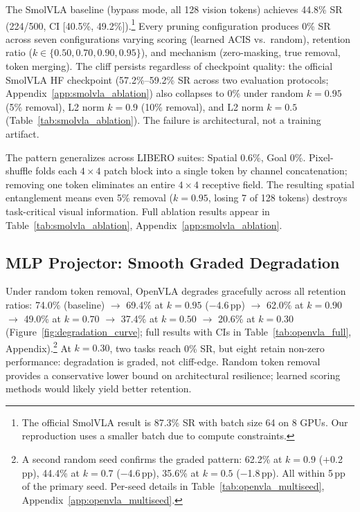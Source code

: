 The SmolVLA baseline (bypass mode, all 128 vision tokens) achieves 44.8\% SR (224/500, CI [40.5\%, 49.2\%]).\footnote{The official SmolVLA result is 87.3\% SR with batch size 64 on 8 GPUs. Our reproduction uses a smaller batch due to compute constraints.} Every pruning configuration produces 0\% SR across seven configurations varying scoring (learned ACIS vs.\ random), retention ratio ($k \in \{0.50, 0.70, 0.90, 0.95\}$), and mechanism (zero-masking, true removal, token merging). The cliff persists regardless of checkpoint quality: the official SmolVLA HF checkpoint (57.2\%--59.2\% SR across two evaluation protocols; Appendix~\ref{app:smolvla_ablation}) also collapses to 0\% under random $k{=}0.95$ (5\% removal), L2 norm $k{=}0.9$ (10\% removal), and L2 norm $k{=}0.5$ (Table~\ref{tab:smolvla_ablation}). The failure is architectural, not a training artifact.

The pattern generalizes across LIBERO suites: Spatial 0.6\%, Goal 0\%. Pixel-shuffle folds each $4{\times}4$ patch block into a single token by channel concatenation; removing one token eliminates an entire $4{\times}4$ receptive field. The resulting spatial entanglement means even 5\% removal ($k{=}0.95$, losing 7 of 128 tokens) destroys task-critical visual information. Full ablation results appear in Table~\ref{tab:smolvla_ablation}, Appendix~\ref{app:smolvla_ablation}.

\subsection{MLP Projector: Smooth Graded Degradation}
\label{sec:openvla_results}

Under random token removal, OpenVLA degrades gracefully across all retention ratios: 74.0\% (baseline) $\rightarrow$ 69.4\% at $k{=}0.95$ ($-4.6$\,pp) $\rightarrow$ 62.0\% at $k{=}0.90$ $\rightarrow$ 49.0\% at $k{=}0.70$ $\rightarrow$ 37.4\% at $k{=}0.50$ $\rightarrow$ 20.6\% at $k{=}0.30$ (Figure~\ref{fig:degradation_curve}; full results with CIs in Table~\ref{tab:openvla_full}, Appendix).\footnote{A second random seed confirms the graded pattern: 62.2\% at $k{=}0.9$ ($+$0.2\,pp), 44.4\% at $k{=}0.7$ ($-$4.6\,pp), 35.6\% at $k{=}0.5$ ($-$1.8\,pp). All within 5\,pp of the primary seed. Per-seed details in Table~\ref{tab:openvla_multiseed}, Appendix~\ref{app:openvla_multiseed}.} At $k{=}0.30$, two tasks reach 0\% SR, but eight retain non-zero performance: degradation is graded, not cliff-edge. Random token removal provides a conservative lower bound on architectural resilience; learned scoring methods would likely yield better retention.

